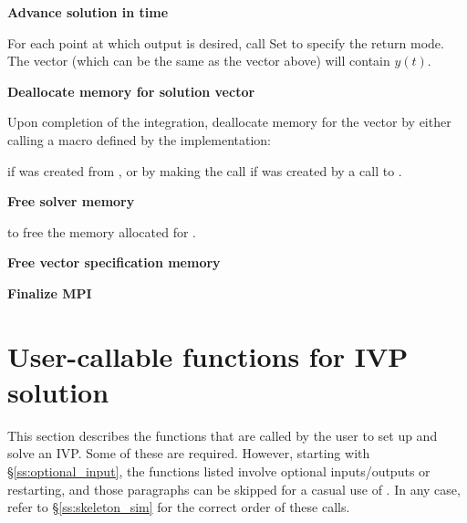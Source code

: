 \begin{Steps}
\item
  {\bf Advance solution in time}

  For each point at which output is desired, call
  Set  to specify the return mode.
  The vector  (which can be the same as
  the vector  above) will contain $y(t)$.
  
\item
  {\bf Deallocate memory for solution vector}

  Upon completion of the integration, deallocate memory for the vector 
  by either calling a macro defined by the {\nvector} implementation:

  {\s} 

  {\p} 

  if  was created from , or by making the call 
   if  was created by a call to .
  
\item
  {\bf Free solver memory}

   to free the memory allocated for {\cvode}.
  
\item
  {\bf Free vector specification memory}

  {\s} 

  {\p} 

\item 
  {\bf {\p} Finalize MPI}
  
\end{Steps}

\section{User-callable functions for IVP solution}
\label{ss:cvode_fct_sim}

This section describes the {\cvode} functions that are called by the user to set up 
and solve an IVP. Some of these are required. However, starting with \S\ref{ss:optional_input},
the functions listed involve optional inputs/outputs or restarting, and those paragraphs can 
be skipped for a casual use of {\cvode}. In any case, refer to \S\ref{ss:skeleton_sim} for
the correct order of these calls.

